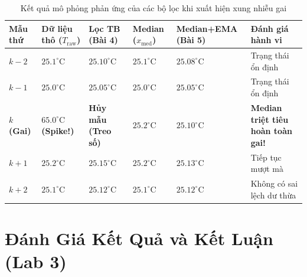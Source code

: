 \begin{table}[h!]
\centering
\small
\begin{tabularx}{\textwidth}{|>{\centering\arraybackslash}p{1.4cm}|>{\centering\arraybackslash}p{2.1cm}|>{\centering\arraybackslash}p{2.1cm}|>{\centering\arraybackslash}p{2.1cm}|>{\centering\arraybackslash}p{2.4cm}|>{\raggedright\arraybackslash}X|}
\hline
\textbf{Mẫu thứ} & \textbf{Dữ liệu thô ($T_{\text{raw}}$)} & \textbf{Lọc TB (Bài 4)} & \textbf{Median ($x_{\text{med}}$)} & \textbf{Median+EMA (Bài 5)} & \textbf{Đánh giá hành vi} \\
\hline
$k-2$ & $25.1^\circ\text{C}$ & $25.10^\circ\text{C}$ & $25.1^\circ\text{C}$ & $25.08^\circ\text{C}$ & Trạng thái ổn định \\
$k-1$ & $25.0^\circ\text{C}$ & $25.05^\circ\text{C}$ & $25.0^\circ\text{C}$ & $25.05^\circ\text{C}$ & Trạng thái ổn định \\
\rowcolor{red!10}
\textbf{$k$ (Gai)} & \textbf{$65.0^\circ\text{C}$ (Spike!)} & \textbf{Hủy mẫu (Treo số)} & \textbf{$25.2^\circ\text{C}$} & \textbf{$25.10^\circ\text{C}$} & \textbf{Median triệt tiêu hoàn toàn gai!} \\
$k+1$ & $25.2^\circ\text{C}$ & $25.15^\circ\text{C}$ & $25.2^\circ\text{C}$ & $25.13^\circ\text{C}$ & Tiếp tục mượt mà \\
$k+2$ & $25.1^\circ\text{C}$ & $25.12^\circ\text{C}$ & $25.1^\circ\text{C}$ & $25.12^\circ\text{C}$ & Không có sai lệch dư thừa \\
\hline
\end{tabularx}
\vspace{0.2cm}
\caption{Kết quả mô phỏng phản ứng của các bộ lọc khi xuất hiện xung nhiễu gai}
\label{tab:sim_noise}
\end{table}

\newpage
\section{Đánh Giá Kết Quả và Kết Luận (Lab 3)}

